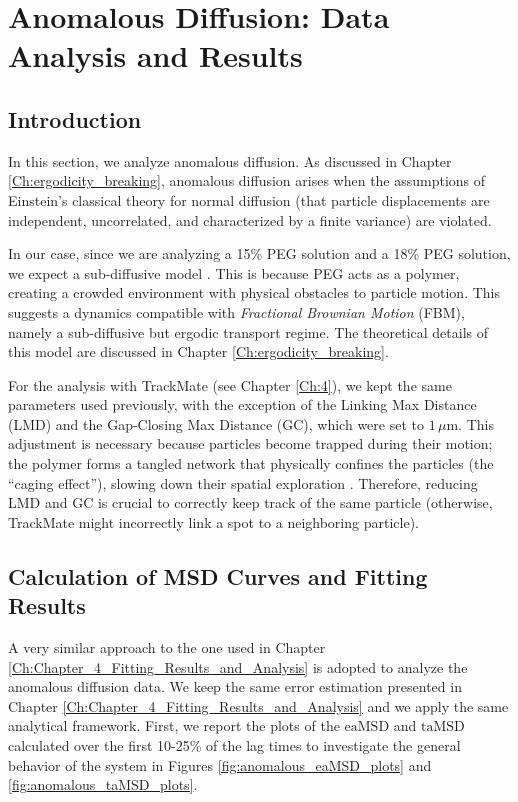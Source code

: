 ﻿\section{Anomalous Diffusion: Data Analysis and Results}\label{Ch:Anomalous_Diff}
\subsection{Introduction}
In this section, we analyze anomalous diffusion. As discussed in Chapter \ref{Ch:ergodicity_breaking}, anomalous diffusion arises when the assumptions of Einstein's classical theory for normal diffusion (that particle displacements are independent, uncorrelated, and characterized by a finite variance) are violated. 


In our case, since we are analyzing a 15\% PEG solution and a 18\% PEG solution, we expect a sub-diffusive model \cite{doi:10.1021/acs.langmuir.7b03418, ijms241311148}. This is because PEG acts as a polymer, creating a crowded environment with physical obstacles to particle motion. This suggests a dynamics compatible with \textit{Fractional Brownian Motion} (FBM), namely a sub-diffusive but ergodic transport regime. The theoretical details of this model are discussed in Chapter \ref{Ch:ergodicity_breaking}.

For the analysis with TrackMate (see Chapter \ref{Ch:4}), we kept the same parameters used previously, with the exception of the Linking Max Distance (LMD) and the Gap-Closing Max Distance (GC), which were set to $1\,\mu\text{m}$. This adjustment is necessary because particles become trapped during their motion; the polymer forms a tangled network that physically confines the particles (the ``caging effect''), slowing down their spatial exploration \cite{doi:10.1021/acs.langmuir.7b03418}. Therefore, reducing LMD and GC is crucial to correctly keep track of the same particle (otherwise, TrackMate might incorrectly link a spot to a neighboring particle).
\subsection{Calculation of MSD Curves and Fitting Results}\label{Ch:Data_analysis_anomalous}
A very similar approach to the one used in Chapter \ref{Ch:Chapter_4_Fitting_Results_and_Analysis} is adopted to analyze the anomalous diffusion data. We keep the same error estimation presented in Chapter \ref{Ch:Chapter_4_Fitting_Results_and_Analysis} and we apply the same analytical framework. First, we report the plots of the $\mathrm{eaMSD}$ and $\mathrm{taMSD}$ calculated over the first 10-25\% of the lag times to investigate the general behavior of the system in Figures \ref{fig:anomalous_eaMSD_plots} and \ref{fig:anomalous_taMSD_plots}.

